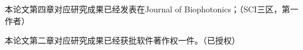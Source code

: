 \begin{inno}

\begin{enumerate}[label={[\arabic*]}]
  \item 本论文第四章对应研究成果已经发表在Journal of Biophotonics；（SCI三区，第一作者）
  \item 本论文第二章对应研究成果已经获批软件著作权一件。（已授权）
\end{enumerate}

\end{inno}